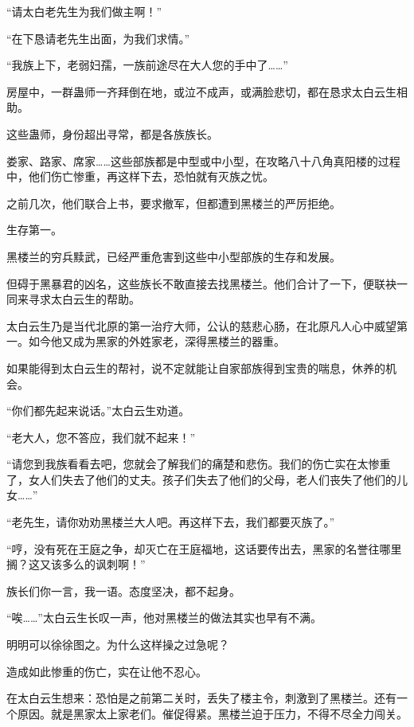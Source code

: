 
\begin{this_body}



“请太白老先生为我们做主啊！”

“在下恳请老先生出面，为我们求情。”

“我族上下，老弱妇孺，一族前途尽在大人您的手中了……”

房屋中，一群蛊师一齐拜倒在地，或泣不成声，或满脸悲切，都在恳求太白云生相助。

这些蛊师，身份超出寻常，都是各族族长。

娄家、路家、席家……这些部族都是中型或中小型，在攻略八十八角真阳楼的过程中，他们伤亡惨重，再这样下去，恐怕就有灭族之忧。

之前几次，他们联合上书，要求撤军，但都遭到黑楼兰的严厉拒绝。

生存第一。

黑楼兰的穷兵黩武，已经严重危害到这些中小型部族的生存和发展。

但碍于黑暴君的凶名，这些族长不敢直接去找黑楼兰。他们合计了一下，便联袂一同来寻求太白云生的帮助。

太白云生乃是当代北原的第一治疗大师，公认的慈悲心肠，在北原凡人心中威望第一。如今他又成为黑家的外姓家老，深得黑楼兰的器重。

如果能得到太白云生的帮衬，说不定就能让自家部族得到宝贵的喘息，休养的机会。

“你们都先起来说话。”太白云生劝道。

“老大人，您不答应，我们就不起来！”

“请您到我族看看去吧，您就会了解我们的痛楚和悲伤。我们的伤亡实在太惨重了，女人们失去了他们的丈夫。孩子们失去了他们的父母，老人们丧失了他们的儿女……”

“老先生，请你劝劝黑楼兰大人吧。再这样下去，我们都要灭族了。”

“哼，没有死在王庭之争，却灭亡在王庭福地，这话要传出去，黑家的名誉往哪里搁？这又该多么的讽刺啊！”

族长们你一言，我一语。态度坚决，都不起身。

“唉……”太白云生长叹一声，他对黑楼兰的做法其实也早有不满。

明明可以徐徐图之。为什么这样操之过急呢？

造成如此惨重的伤亡，实在让他不忍心。

在太白云生想来：恐怕是之前第二关时，丢失了楼主令，刺激到了黑楼兰。还有一个原因。就是黑家太上家老们。催促得紧。黑楼兰迫于压力，不得不尽全力闯关。


\end{this_body}
